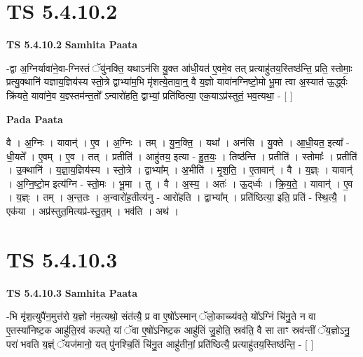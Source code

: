 \documentclass[17pt]{extarticle}
\begin{document}
\section*{ TS 5.4.10.2 }

\textbf{TS 5.4.10.2 } \newline
\textbf{Samhita Paata} \newline

-द्वा अ॒ग्निर्यावा॑ने॒वा-ग्निस्तं ॅयु॑नक्ति॒ यथाऽन॑सि यु॒क्त आ॑धी॒यत॑ ए॒वमे॒व तत् प्रत्याहु॑तय॒स्तिष्ठ॑न्ति॒ प्रति॒ स्तोमाः॒ प्रत्यु॒क्थानि॑ यज्ञाय॒ज्ञिय॑स्य स्तो॒त्रे द्वाभ्या॑म॒भि मृ॑शत्ये॒तावा॒न्॒ वै य॒ज्ञो यावा॑नग्निष्टो॒मो भू॒मा त्वा अ॒स्यात॑ ऊ॒र्द्ध्वः क्रि॑यते॒ यावा॑ने॒व य॒ज्ञ्स्तम॑न्त॒तो᳚ ऽन्वारो॑हति॒ द्वाभ्यां॒ प्रति॑ष्ठित्या॒ एक॒याऽप्र॑स्तुतं॒ भव॒त्यथा॒ - [  ] \newline

\textbf{Pada Paata} \newline

वै । अ॒ग्निः । यावान्॑ । ए॒व । अ॒ग्निः । तम् । यु॒न॒क्ति॒ । यथा᳚ । अन॑सि । यु॒क्ते । आ॒धी॒यत॒ इत्या᳚ - धी॒यते᳚ । ए॒वम् । ए॒व । तत् । प्रतीति॑ । आहु॑तय॒ इत्या - हु॒त॒यः॒ । तिष्ठ॑न्ति । प्रतीति॑ । स्तोमाः᳚ । प्रतीति॑ । उ॒क्थानि॑ । य॒ज्ञा॒य॒ज्ञिय॑स्य । स्तो॒त्रे । द्वाभ्या᳚म् । अ॒भीति॑ । मृ॒श॒ति॒ । ए॒तावान्॑ । वै । य॒ज्ञ्ः । यावान्॑ । अ॒ग्नि॒ष्टो॒म इत्य॑ग्नि - स्तो॒मः । भू॒मा । तु । वै । अ॒स्य॒ । अतः॑ । ऊ॒द्‌र्ध्वः । क्रि॒य॒ते॒ । यावान्॑ । ए॒व । य॒ज्ञ्ः । तम् । अ॒न्त॒तः । अ॒न्वारो॑ह॒तीत्य॑नु - आरो॑हति । द्वाभ्या᳚म् । प्रति॑ष्ठित्या॒ इति॒ प्रति॑ - स्थि॒त्यै॒ । एक॑या । अप्र॑स्तुत॒मित्यप्र॑-स्तु॒त॒म् । भव॑ति । अथ॑ ।  \newline




\section*{ TS 5.4.10.3 }

\textbf{TS 5.4.10.3 } \newline
\textbf{Samhita Paata} \newline

-भि मृ॑श॒त्युपै॑न॒मुत्त॑रो य॒ज्ञो न॑म॒त्यथो॒ संत॑त्यै॒ प्र वा ए॒षो᳚ऽस्मान् ॅलो॒काच्च्य॑वते॒ यो᳚ऽग्निं चि॑नु॒ते न वा ए॒तस्या॑निष्ट॒क आहु॑ति॒रव॑ कल्पते॒ यां ॅवा ए॒षो॑ऽनिष्ट॒क आहु॑तिं जु॒होति॒ स्रव॑ति॒ वै सा ताꣳ स्रव॑न्तीं ॅय॒ज्ञोऽनु॒ परा॑ भवति य॒ज्ञ्ं ॅयज॑मानो॒ यत् पु॑नश्चि॒तिं चि॑नु॒त आहु॑तीनां॒ प्रति॑ष्ठित्यै॒ प्रत्याहु॑तय॒स्तिष्ठ॑न्ति॒ - [  ] \newline
\end{document}
